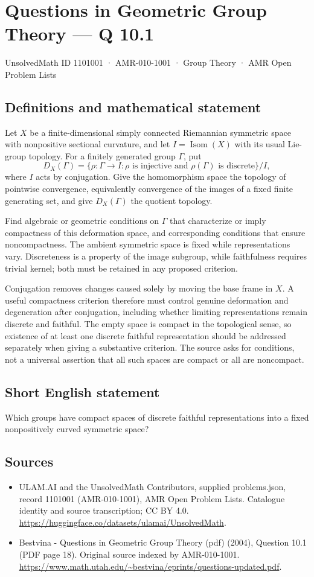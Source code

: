 \documentclass[11pt,a4paper]{article}
\begin{document}
\section*{Questions in Geometric Group Theory — Q 10.1}\label{1101001}
{\small UnsolvedMath ID 1101001 · AMR-010-1001 · Group Theory · AMR Open Problem Lists}
\subsection{Definitions and mathematical statement}
Let $X$ be a finite-dimensional simply connected Riemannian symmetric space with nonpositive sectional curvature, and let $I=\operatorname{Isom}(X)$ with its usual Lie-group topology. For a finitely generated group $\Gamma$, put
\[
 D_X(\Gamma)=\{\rho:\Gamma\to I:\rho\text{ is injective and }
                          \rho(\Gamma)\text{ is discrete}\}/I,
\]
where $I$ acts by conjugation. Give the homomorphism space the topology of pointwise convergence, equivalently convergence of the images of a fixed finite generating set, and give $D_X(\Gamma)$ the quotient topology.

Find algebraic or geometric conditions on $\Gamma$ that characterize or imply compactness of this deformation space, and corresponding conditions that ensure noncompactness. The ambient symmetric space is fixed while representations vary. Discreteness is a property of the image subgroup, while faithfulness requires trivial kernel; both must be retained in any proposed criterion.

Conjugation removes changes caused solely by moving the base frame in $X$. A useful compactness criterion therefore must control genuine deformation and degeneration after conjugation, including whether limiting representations remain discrete and faithful. The empty space is compact in the topological sense, so existence of at least one discrete faithful representation should be addressed separately when giving a substantive criterion. The source asks for conditions, not a universal assertion that all such spaces are compact or all are noncompact.
\subsection{Short English statement}
Which groups have compact spaces of discrete faithful representations into a fixed nonpositively curved symmetric space?
\subsection{Sources}
\begin{itemize}
\item[S1] ULAM.AI and the UnsolvedMath Contributors, supplied problems.json, record 1101001 (AMR-010-1001), AMR Open Problem Lists. Catalogue identity and source transcription; CC BY 4.0.
\url{https://huggingface.co/datasets/ulamai/UnsolvedMath}.
\item[S2] Bestvina - Questions in Geometric Group Theory (pdf) (2004), Question 10.1 (PDF page 18). Original source indexed by AMR-010-1001.
\url{https://www.math.utah.edu/~bestvina/eprints/questions-updated.pdf}.
\end{itemize}
\end{document}
